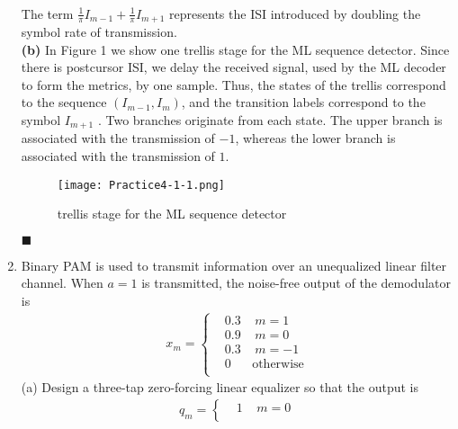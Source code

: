 \documentclass[a4paper,12pt]{article}
\begin{document}
\begin{enumerate}
\begin{align*}
            \end{align*}
            The term $\frac{1}{\pi} I_{m - 1} + \frac{1}{\pi} I_{m + 1}$ represents the ISI introduced by doubling the symbol rate of transmission. \\
            \newpage
            \textbf{(b)} In Figure 1 we show one trellis stage for the ML sequence detector. Since there is postcursor ISI, we delay the received signal, used by the ML decoder to form the metrics, by one sample. Thus, the states of the trellis correspond to the sequence $\left( I_{m - 1}, I_m \right)$, and the transition labels correspond to the symbol $I_{m + 1}$ . Two branches originate from each state. The upper branch is associated with the transmission of $-1$, whereas the lower branch is associated with the transmission of $1$. 
            \begin{figure}[h]
                \centering
                \texttt{[image: Practice4-1-1.png]}
                \caption{trellis stage for the ML sequence detector}
            \end{figure}
            \begin{flushright}
                $\blacksquare$
            \end{flushright}
        \item
            Binary PAM is used to transmit information over an unequalized linear filter channel. When $a = 1$ is transmitted, the noise-free output of the demodulator is
            \begin{align*}
                x_m = \left\{ 
                \begin{aligned}
                    & 0.3 \;\;\;\; m = 1 \\
                    & 0.9 \;\;\;\; m = 0 \\ 
                    & 0.3 \;\;\;\; m = -1 \\
                    & 0 \;\;\;\;\;\; \text{otherwise} \\
                \end{aligned}
            \right.
            \end{align*}
            (a) Design a three-tap zero-forcing linear equalizer so that the output is 
            \begin{align*}
                q_m = \left\{ 
                \begin{aligned}
                    & 1 \;\;\;\; m = 0 \\

\end{aligned}
\end{align*}
\end{enumerate}
\end{document}

